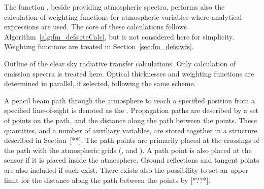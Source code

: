 The function , beside providing atmospheric spectra,
performs also the calculation of weighting functions for atmospheric
variables where analytical expressions are used. The core of these
calculations follows Algorithm~\ref{alg:fm_defs:rteCalc}, but is not
considered here for simplicity. Weighting functions are treated in
Section~\ref{sec:fm_defs:wfs}.

\begin{algorithm}[!t]
 \begin{algorithmic}
  \ENDIF
     \ENDIF
    \ENDFOR
   \ENDFOR
  \ENDFOR
 \end{algorithmic}
 \caption{Outline of the clear sky radiative transfer calculations. Only
   calculation of emission spectra is treated here.
   Optical thicknesses and weighting functions are
   determined in parallel, if selected, following the same scheme.}
 \label{alg:fm_defs:rteCalc}
\end{algorithm}


\label{sec:fm_defs:ppaths}

A pencil beam path through the atmosphere to reach a specified
position from a specified line-of-sight is denoted as the
. Propagation paths are described by a set
of points on the path, and the distance along the path between the
points. These quantities, and a number of auxiliary variables, are
stored together in a structure described in Section~[**]. The path
points are primarily placed at the crossings of the path with the
atmospheric grids (,  and
). A path point is also placed at the sensor if
it is placed inside the atmosphere.  Ground reflections and tangent
points are also included if such exist.  There exists also the
possibility to set an upper limit for the distance along the path
between the points by [*??*].

